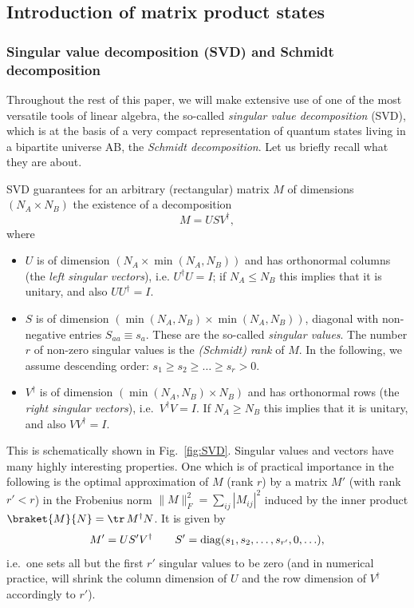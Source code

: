\subsection{Introduction of matrix product states}

\subsubsection{Singular value decomposition (SVD) and Schmidt decomposition}
Throughout the rest of this paper, we will make extensive use of one of the most versatile tools of linear algebra, the so-called {\em singular value decomposition} (SVD), which is at the basis of a very compact representation of quantum states living in a bipartite universe AB, the {\em Schmidt decomposition}. Let us briefly recall what they are about.

SVD guarantees for an arbitrary (rectangular) matrix $M$ of dimensions $(N_A \times N_B)$ the existence of a decomposition
\begin{equation}
M =   U S V^\dagger ,
\end{equation}
where 
\begin{itemize}
\item $U$ is of dimension $(N_A \times \min (N_A,N_B))$ and has orthonormal columns (the {\em left singular vectors}), i.e. $U^\dagger U = I$; if $N_A \leq N_B$ this implies that it is unitary, and also $UU^\dagger = I$. 
\item $S$ is of dimension $(\min (N_A,N_B) \times \min (N_A,N_B))$, diagonal with non-negative entries $S_{aa} \equiv s_a$. These are the so-called {\em singular values}. The number $r$ of non-zero singular values is the {\em (Schmidt) rank} of $M$. In the following, we assume descending order: $s_1 \geq s_2 \geq \ldots \geq s_r > 0.$
\item $V^\dagger$ is of dimension $(\min (N_A,N_B) \times N_B)$ and has orthonormal rows (the {\em right singular vectors}), i.e.\ $V^\dagger V = I$. If $N_A \geq N_B$ this implies that it is unitary, and also $VV^\dagger  = I$.
\end{itemize}
This is schematically shown in Fig.~\ref{fig:SVD}. Singular values and vectors have many highly interesting properties. One which is of practical importance in the following is the optimal approximation of $M$ (rank $r$) by a matrix $M'$ (with rank $r'<r$) in the Frobenius norm $\| M \|_F^2 = \sum_{ij} |M_{ij}|^2$ induced by the inner product $\braket{M}{N}= \tr\, M^\dagger N$. It is given by 
\begin{equation}
M' = U S' V^\dagger \quad\quad S'={\rm diag} (s_1, s_2, \ldots, s_{r'}, 0,\ldots ),
\end{equation} 
i.e.\ one sets all but the first $r'$ singular values to be zero (and in numerical practice, will shrink the column dimension of $U$ and the row dimension of $V^\dagger$ accordingly to $r'$).

